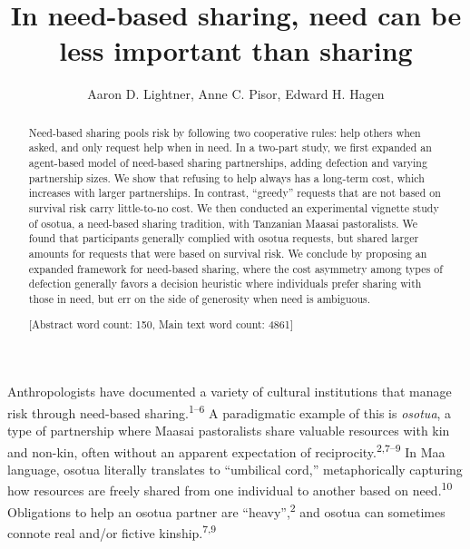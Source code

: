 \documentclass[
]{article}
\title{In need-based sharing, need can be less important than sharing}
\author{Aaron D. Lightner, Anne C. Pisor, Edward H. Hagen}
\date{}
\begin{document}
\maketitle
\begin{abstract}
Need-based sharing pools risk by following two cooperative rules: help others when asked, and only request help when in need. In a two-part study, we first expanded an agent-based model of need-based sharing partnerships, adding defection and varying partnership sizes. We show that refusing to help always has a long-term cost, which increases with larger partnerships. In contrast, ``greedy'' requests that are not based on survival risk carry little-to-no cost. We then conducted an experimental vignette study of osotua, a need-based sharing tradition, with Tanzanian Maasai pastoralists. We found that participants generally complied with osotua requests, but shared larger amounts for requests that were based on survival risk. We conclude by proposing an expanded framework for need-based sharing, where the cost asymmetry among types of defection generally favors a decision heuristic where individuals prefer sharing with those in need, but err on the side of generosity when need is ambiguous.

{[}Abstract word count: 150, Main text word count: 4861{]}
\end{abstract}

Anthropologists have documented a variety of cultural institutions that manage risk through need-based sharing.\textsuperscript{1--6} A paradigmatic example of this is \emph{osotua}, a type of partnership where Maasai pastoralists share valuable resources with kin and non-kin, often without an apparent expectation of reciprocity.\textsuperscript{2,7--9} In Maa language, osotua literally translates to ``umbilical cord,'' metaphorically capturing how resources are freely shared from one individual to another based on need.\textsuperscript{10} Obligations to help an osotua partner are ``heavy'',\textsuperscript{2} and osotua can sometimes connote real and/or fictive kinship.\textsuperscript{7,9}
\end{document}
